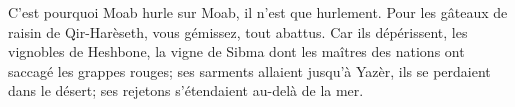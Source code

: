 C’est pourquoi Moab hurle sur Moab, il n’est que hurlement.
Pour les gâteaux de raisin de Qir-Harèseth,
	vous gémissez, tout abattus.
Car ils dépérissent, les vignobles de Heshbone,
	la vigne de Sibma
		dont les maîtres des nations ont saccagé les grappes rouges;
	ses sarments allaient jusqu’à Yazèr, ils se perdaient dans le désert;
	ses rejetons s’étendaient au-delà de la mer.
